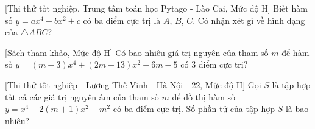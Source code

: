 \begin{bt}%
[Thi thử tốt nghiệp, Trung tâm toán học Pytago - Lào Cai, Mức độ H]%
	Biết hàm số $y=ax^4+bx^2+c$ có ba điểm cực trị là $A$, $B$, $C$. Có nhận xét gì về hình dạng của $\triangle{ABC}$?
\end{bt}

\begin{bt}%
[Sách tham khảo, Mức độ H]%
	Có bao nhiêu giá trị nguyên của tham số $ m $ để hàm số $ y=(m+3)x^4 +(2m-13)x^2 +6m-5$ có $ 3 $ điểm cực trị?
\end{bt}

\begin{bt}%
[Thi thử tốt nghiệp - Lương Thế Vinh - Hà Nội - 22, Mức độ H]%
	Gọi $S$ là tập hợp tất cả các giá trị nguyên âm của tham số $m$ để đồ thị hàm số $y=x^4-2(m+1)x^2+m^2$ có ba điểm cực trị. Số phần tử của tập hợp $S$ là bao nhiêu?
\end{bt}

